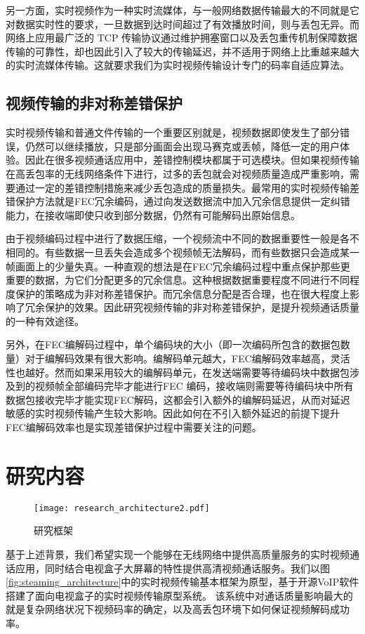 另一方面，实时视频作为一种实时流媒体，与一般网络数据传输最大的不同就是它对数据实时性的要求，一旦数据到达时间超过了有效播放时间，则与丢包无异。而网络上应用最广泛的 TCP 传输协议通过维护拥塞窗口以及丢包重传机制保障数据传输的可靠性，却也因此引入了较大的传输延迟，并不适用于网络上比重越来越大的实时流媒体传输。这就要求我们为实时视频传输设计专门的码率自适应算法。

\subsection{视频传输的非对称差错保护}
实时视频传输和普通文件传输的一个重要区别就是，视频数据即使发生了部分错误，仍然可以继续播放，只是部分画面会出现马赛克或丢帧，降低一定的用户体验。因此在很多视频通话应用中，差错控制模块都属于可选模块。但如果视频传输在高丢包率的无线网络条件下进行，过多的丢包就会对视频质量造成严重影响，需要通过一定的差错控制措施来减少丢包造成的质量损失。最常用的实时视频传输差错保护方法就是FEC冗余编码，通过向发送数据流中加入冗余信息提供一定纠错能力，在接收端即使只收到部分数据，仍然有可能解码出原始信息。

由于视频编码过程中进行了数据压缩，一个视频流中不同的数据重要性一般是各不相同的。有些数据一旦丢失会造成多个视频帧无法解码，而有些数据只会造成某一帧画面上的少量失真。一种直观的想法是在FEC冗余编码过程中重点保护那些更重要的数据，为它们分配更多的冗余信息。这种根据数据重要程度不同进行不同程度保护的策略成为非对称差错保护。而冗余信息分配是否合理，也在很大程度上影响了冗余保护的效果。因此研究视频传输的非对称差错保护，是提升视频通话质量的一种有效途径。

另外，在FEC编解码过程中，单个编码块的大小（即一次编码所包含的数据包数量）对于编解码效果有很大影响。编解码单元越大，FEC编解码效率越高，灵活性也越好。然而如果采用较大的编解码单元，在发送端需要等待编码块中数据包涉及到的视频帧全部编码完毕才能进行FEC 编码，接收端则需要等待编码块中所有数据包接收完毕才能实现FEC解码，这都会引入额外的编解码延迟，从而对延迟敏感的实时视频传输产生较大影响。因此如何在不引入额外延迟的前提下提升FEC编解码效率也是实现差错保护过程中需要关注的问题。

\section{研究内容}
\begin{figure}[htbp]
  \centering
  \texttt{[image: research\_architecture2.pdf]}
  \caption{研究框架}
  \label{fig:research_architecture}
\end{figure}

基于上述背景，我们希望实现一个能够在无线网络中提供高质量服务的实时视频通话应用，同时结合电视盒子大屏幕的特性提供高清视频通话服务。我们以图 \ref{fig:steaming_architecture}中的实时视频传输基本框架为原型，基于开源VoIP软件搭建了面向电视盒子的实时视频传输原型系统。
该系统中对通话质量影响最大的就是复杂网络状况下视频码率的确定，以及高丢包环境下如何保证视频解码成功率。

